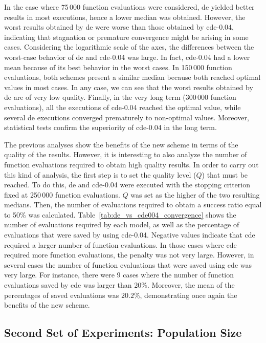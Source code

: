 \documentclass[preprint,3p]{elsarticle}
\newcommand{\CDE}{c{\sc de}}
\newcommand{\DE}{{\sc de}}
\begin{document}
%
In the case where 75$\,$000 function evaluations were considered, \DE{} yielded better results in most executions, hence a lower median was obtained.
%
However, the worst results obtained by \DE{} were worse than those obtained by
\CDE{}-0.04, indicating that stagnation or premature convergence might be arising in some cases.
%
Considering the logarithmic scale of the axes, the differences between the worst-case behavior of \DE{} and \CDE{}-0.04 was large.
%
In fact, \CDE{}-0.04 had a lower mean because of its best behavior in the worst cases.
%
In 150$\,$000 function evaluations, both schemes present a similar median because both reached optimal values in most cases.
%
In any case, we can see that the worst results obtained by \DE{} are of very low quality.
%
Finally, in the very long term (300$\,$000 function evaluations), all the executions of \CDE{}-0.04
reached the optimal value, while several \DE{} executions converged prematurely to non-optimal
values.
%
Moreover, statistical tests confirm the superiority of \CDE{}-0.04 in the long term.


The previous analyses show the benefits of the new scheme in terms of the quality of the results.
%
However, it is interesting to also analyze the number of function evaluations required to obtain high quality results.
%
In order to carry out this kind of analysis, the first step is to set the quality level ($Q$) that must be reached.
%
To do this, \DE{} and \CDE{}-0.04 were executed with the stopping criterion fixed at 250$\,$000 function evaluations.
%
$Q$ was set as the higher of the two resulting medians.
%
Then, the number of evaluations required to obtain a success ratio equal to 50\% was calculated.
%
Table~\ref{tab:de_vs_cde004_convergence} shows the number of evaluations required by each model, as well as the percentage of evaluations
that were saved by using \CDE{}-0.04.
%
Negative values indicate that \CDE{} required a larger number of function evaluations.
%
In those cases where \CDE{} required more function evaluations, the penalty was not very large.
%
However, in several cases the number of function evaluations that were saved using \CDE{} was very large.
%
For instance, there were 9 cases where the number of function evaluations saved by \CDE{} was larger than 20\%.
%
Moreover, the mean of the percentages of saved evaluations was $20.2\%$, demonstrating once again the benefits of the new scheme.



\subsection{Second Set of Experiments: Population Size}
\end{document}
